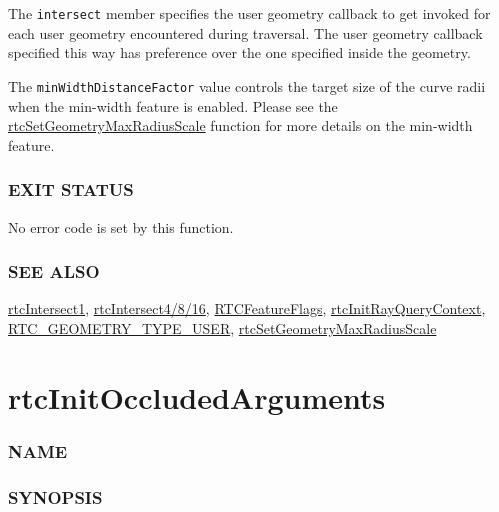 The \texttt{intersect} member specifies the user geometry callback to
get invoked for each user geometry encountered during traversal. The
user geometry callback specified this way has preference over the one
specified inside the geometry.

The \texttt{minWidthDistanceFactor} value controls the target size of
the curve radii when the min-width feature is enabled. Please see the
\hyperref[rtcsetgeometrymaxradiusscale]{rtcSetGeometryMaxRadiusScale}
function for more details on the min-width feature.

\subsubsection{EXIT STATUS}\label{exit-status}

No error code is set by this function.

\subsubsection{SEE ALSO}\label{see-also}

\hyperref[rtcintersect1]{rtcIntersect1},
\hyperref[rtcintersect4816]{rtcIntersect4/8/16},
\hyperref[rtcfeatureflags]{RTCFeatureFlags},
\hyperref[rtcinitrayquerycontext]{rtcInitRayQueryContext},
\hyperref[rtc_geometry_type_user]{RTC\_GEOMETRY\_TYPE\_USER},
\hyperref[rtcsetgeometrymaxradiusscale]{rtcSetGeometryMaxRadiusScale}

\pagebreak

\section{rtcInitOccludedArguments}\label{rtcinitoccludedarguments}

\subsubsection{NAME}\label{name}

\begin{Shaded}
\begin{Highlighting}[]
\OperatorTok{{-}}
\end{Highlighting}
\end{Shaded}

\subsubsection{SYNOPSIS}\label{synopsis}

